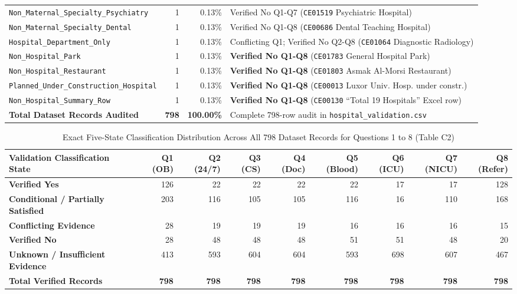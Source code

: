 \documentclass[10pt,a4paper]{article}
\begin{document}
{\begin{table}[ht!]
\begin{tabular}{l r r l}
\texttt{Non\_Maternal\_Specialty\_Psychiatry} & 1 & 0.13\% & Verified No Q1-Q7 (\texttt{CE01519} Psychiatric Hospital) \\
\texttt{Non\_Maternal\_Specialty\_Dental} & 1 & 0.13\% & Verified No Q1-Q8 (\texttt{CE00686} Dental Teaching Hospital) \\
\texttt{Hospital\_Department\_Only} & 1 & 0.13\% & Conflicting Q1; Verified No Q2-Q8 (\texttt{CE01064} Diagnostic Radiology) \\
\texttt{Non\_Hospital\_Park} & 1 & 0.13\% & \textbf{Verified No Q1-Q8} (\texttt{CE01783} General Hospital Park) \\
\texttt{Non\_Hospital\_Restaurant} & 1 & 0.13\% & \textbf{Verified No Q1-Q8} (\texttt{CE01803} Asmak Al-Morsi Restaurant) \\
\texttt{Planned\_Under\_Construction\_Hospital} & 1 & 0.13\% & \textbf{Verified No Q1-Q8} (\texttt{CE00013} Luxor Univ. Hosp. under constr.) \\
\texttt{Non\_Hospital\_Summary\_Row} & 1 & 0.13\% & \textbf{Verified No Q1-Q8} (\texttt{CE00130} ``Total 19 Hospitals'' Excel row) \\
\midrule
\textbf{Total Dataset Records Audited} & \textbf{798} & \textbf{100.00\%} & Complete 798-row audit in \texttt{hospital\_validation.csv} \\
\bottomrule
\end{tabular}
\end{table}
}

{\footnotesize
\begin{table}[ht!]
\centering
\caption{Exact Five-State Classification Distribution Across All 798 Dataset Records for Questions 1 to 8 (Table C2)}
\label{tab:table_c2}
\begin{tabular}{l r r r r r r r r}
\toprule
\textbf{Validation Classification State} & \textbf{Q1 (OB)} & \textbf{Q2 (24/7)} & \textbf{Q3 (CS)} & \textbf{Q4 (Doc)} & \textbf{Q5 (Blood)} & \textbf{Q6 (ICU)} & \textbf{Q7 (NICU)} & \textbf{Q8 (Refer)} \\
\midrule
\textbf{Verified Yes} & 126 & 22 & 22 & 22 & 22 & 17 & 17 & 128 \\
\textbf{Conditional / Partially Satisfied} & 203 & 116 & 105 & 105 & 116 & 16 & 110 & 168 \\
\textbf{Conflicting Evidence} & 28 & 19 & 19 & 19 & 16 & 16 & 16 & 15 \\
\textbf{Verified No} & 28 & 48 & 48 & 48 & 51 & 51 & 48 & 20 \\
\textbf{Unknown / Insufficient Evidence} & 413 & 593 & 604 & 604 & 593 & 698 & 607 & 467 \\
\midrule
\textbf{Total Verified Records} & \textbf{798} & \textbf{798} & \textbf{798} & \textbf{798} & \textbf{798} & \textbf{798} & \textbf{798} & \textbf{798} \\
\bottomrule
\end{tabular}
\end{table}
}
\end{document}
